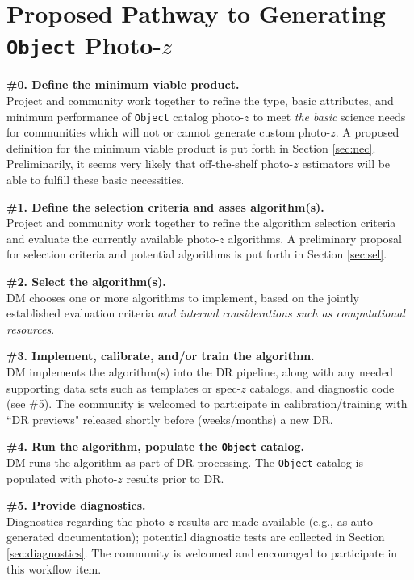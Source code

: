 \documentclass[DM,lsstdraft,toc]{lsstdoc}
\begin{document}
\section{Proposed Pathway to Generating {\tt Object} Photo-$z$}\label{sec:path}

{\bf \#0. Define the minimum viable product.}\\
Project and community work together to refine the type, basic attributes, and minimum performance of {\tt Object} catalog photo-$z$ to meet {\it the basic} science needs for communities which will not or cannot generate custom photo-$z$.
A proposed definition for the minimum viable product is put forth in Section \ref{sec:nec}.
Preliminarily, it seems very likely that off-the-shelf photo-$z$ estimators will be able to fulfill these basic necessities.

{\bf \#1. Define the selection criteria and asses algorithm(s).}\\
Project and community work together to refine the algorithm selection criteria and evaluate the currently available photo-$z$ algorithms.
A preliminary proposal for selection criteria and potential algorithms is put forth in Section \ref{sec:sel}.

{\bf \#2. Select the algorithm(s).}\\
DM chooses one or more algorithms to implement, based on the jointly established evaluation criteria {\it and internal considerations such as computational resources}.

{\bf \#3. Implement, calibrate, and/or train the algorithm.}\\
DM implements the algorithm(s) into the DR pipeline, along with any needed supporting data sets such as templates or spec-$z$ catalogs, and diagnostic code (see \#5).
The community is welcomed to participate in calibration/training with ``DR previews" released shortly before (weeks/months) a new DR.

{\bf \#4. Run the algorithm, populate the {\tt Object} catalog.}\\
DM runs the algorithm as part of DR processing.
The {\tt Object} catalog is populated with photo-$z$ results prior to DR.

{\bf \#5. Provide diagnostics.}\\
Diagnostics regarding the photo-$z$ results are made available (e.g., as auto-generated documentation); potential diagnostic tests are collected in Section \ref{sec:diagnostics}.
The community is welcomed and encouraged to participate in this workflow item.
\end{document}
